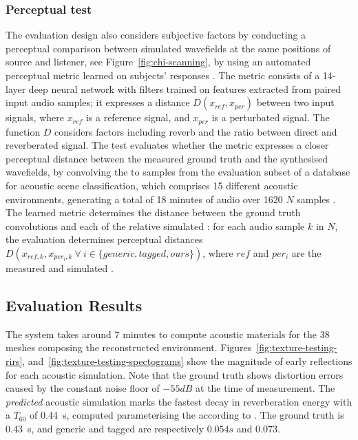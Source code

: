 \subsubsection{Perceptual test}
The evaluation design also considers subjective factors by conducting a perceptual comparison between simulated wavefields at the same positions of source and listener, see Figure~\ref{fig:chi-scanning}, by using an automated perceptual metric learned on subjects’ responses \citep{manocha2020differentiable}. The metric consists of a 14-layer deep neural network with filters trained on features extracted from paired input audio samples; it expresses a distance $D(x_{ref}, x_{per})$ between two input signals, where $x_{ref}$ is a reference signal, and $x_{per}$ is a perturbated signal. The function $D$ considers factors including reverb and the ratio between direct and reverberated signal. The test evaluates whether the metric expresses a closer perceptual distance between the measured ground truth and the synthesised wavefields, by convolving the  to samples from the evaluation subset of a database for acoustic scene classification, which comprises 15 different acoustic environments, generating a total of 18 minutes of audio over 1620 $N$ samples \citep{mesaros2016tut}. The learned metric determines the distance between the ground truth convolutions and each of the relative simulated : for each audio sample $k$ in $N$, the evaluation determines perceptual distances $D(x_{ref, k}, x_{per_i, k}~\forall~i \in \{generic, tagged, ours\})$, where $ref$ and $per_i$ are the measured and simulated .

\subsection{Evaluation Results}
The system takes around 7 minutes to compute acoustic materials for the 38 meshes composing the reconstructed environment.
Figures~\ref{fig:texture-testing-rirs}, and~\ref{fig:texture-testing-spectograms} show the magnitude of early reflections for each acoustic simulation. Note that the ground truth shows distortion errors caused by the constant noise floor of $-55dB$ at the time of measurement. The \emph{predicted} acoustic simulation marks the fastest decay in reverberation energy with a $T_{60}$ of \qty{0.44}{\second}, computed parameterising the  according to \cite{lima_RIR_Parameters}. The ground truth is \qty{0.43}{\second}, and generic and tagged are respectively $0.054s$ and $0.073$.

